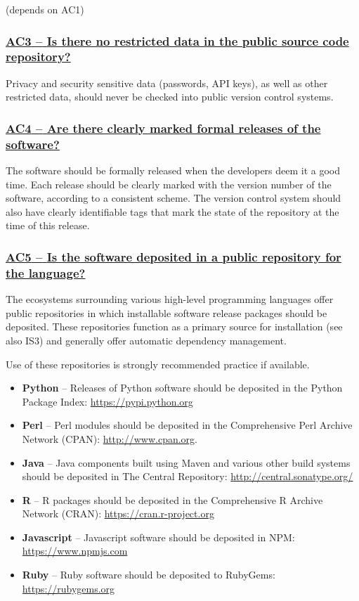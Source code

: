 \documentclass[a4paper,11pt]{article}
\newcommand{\criterion}[1]{\subsubsection*{\underline{#1}}}
\begin{document}
(depends on AC1)

\newcommand{\acThreeID}{AC3}
\newcommand{\acThreeText}{Is there no restricted data in the public source code repository?}
\criterion{\acThreeID{ }--{ }\acThreeText}\label{id:ac3} 

Privacy and security sensitive data (passwords, API keys), as well as other
restricted data, should never be checked into public version control systems.

\newcommand{\acFourID}{AC4}
\newcommand{\acFourText}{Are there clearly marked formal releases of the software?}
\criterion{\acFourID{ }--{ }\acFourText}\label{id:ac4} 

The software should be formally released when the developers deem it a good
time. Each release should be clearly marked with the version number of the
software, according to a consistent scheme. The version control system should
also have clearly identifiable tags that mark the state of the repository at
the time of this release.

\newcommand{\acFiveID}{AC5}
\newcommand{\acFiveText}{Is the software deposited in a public repository for the language?}
\criterion{\acFiveID{ }--{ }\acFiveText}\label{id:ac5} 

The ecosystems surrounding various high-level programming languages offer
public repositories in which installable software release packages should be
deposited. These repositories function as a primary source for installation (see also
IS3) and generally offer automatic dependency management.

Use of these repositories is strongly recommended practice if available.

\begin{itemize}
    \item \textbf{Python} -- Releases of Python software should be deposited in
        the Python Package Index: \url{https://pypi.python.org}
    \item \textbf{Perl} --  Perl modules should be deposited in the Comprehensive
        Perl Archive Network (CPAN): \url{http://www.cpan.org}.
    \item \textbf{Java} -- Java components built using Maven and various other
        build systems should be deposited in The Central Repository: \url{http://central.sonatype.org/}
    \item \textbf{R} -- R packages should be deposited in the Comprehensive R
        Archive Network (CRAN): \url{https://cran.r-project.org}
    \item \textbf{Javascript} -- Javascript software should be deposited in
        NPM: \url{https://www.npmjs.com}
    \item \textbf{Ruby} -- Ruby software should be deposited to 
        RubyGems: \url{https://rubygems.org}
\end{itemize}
\end{document}
